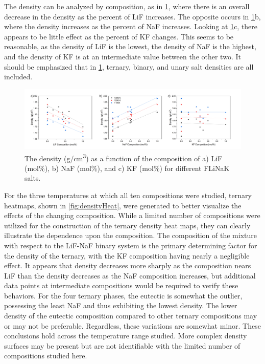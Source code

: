 \documentclass[preprint,12pt]{elsarticle}
\begin{document}
\noindent The density can be analyzed by composition, as in \cref{fig:density3comp}, where there is an overall decrease in the density as the percent of LiF increases. The opposite occurs in \cref{fig:density3comp}b, where the density increases as the percent of NaF increases. Looking at \cref{fig:density3comp}c, there appears to be little effect as the percent of KF changes. This seems to be reasonable, as the density of LiF is the lowest, the density of NaF is the highest, and the density of KF is at an intermediate value between the other two. It should be emphasized that in \cref{fig:density3comp}, ternary, binary, and unary salt densities are all included. 
\begin{figure}[!h]
    \centering
    \includegraphics[width=\textwidth]{densityAll3_fixed.png}
    \caption{The density (g/cm\textsuperscript{3}) as a function of the composition of a) LiF (mol\%), b) NaF (mol\%), and c) KF (mol\%) for different FLiNaK salts.}
    \label{fig:density3comp}
\end{figure}
For the three temperatures at which all ten compositions were studied, ternary heatmaps, shown in \cref{fig:densityHeat}, were generated to better visualize the effects of the changing composition. While a limited number of compositions were utilized for the construction of the ternary density heat maps, they can clearly illustrate the dependence upon the composition. The composition of the mixture with respect to the LiF-NaF binary system is the primary determining factor for the density of the ternary, with the KF composition having nearly a negligible effect. It appears that density decreases more sharply as the composition nears LiF than the density decreases as the NaF composition increases, but additional data points at intermediate compositions would be required to verify these behaviors. For the four ternary phases, the eutectic is somewhat the outlier, possessing the least NaF and thus exhibiting the lowest density. The lower density of the eutectic composition compared to other ternary compositions may or may not be preferable. Regardless, these variations are somewhat minor. These conclusions hold across the temperature range studied. More complex density surfaces may be present but are not identifiable with the limited number of compositions studied here. 
\end{document}
